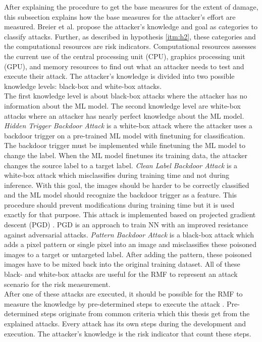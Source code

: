 After explaining the procedure to get the base measures for the extent of damage, this subsection explains how the base measures for the attacker's effort are measured. Breier et al. \cite{DBLP:journals/corr/abs-2012-04884} propose the attacker's knowledge and goal as categories to classify attacks. Further, as described in hypothesis \ref{itm:h2}, these categories and the computational resources are risk indicators. Computational resources assesses the current use of the central processing unit (CPU), graphics processing unit (GPU), and memory resources to find out what an attacker needs to test and execute their attack. The attacker's knowledge is divided into two possible knowledge levels: black-box and white-box attacks. \\
The first knowledge level is about black-box attacks where the attacker has no information about the ML model.
The second knowledge level are white-box attacks where an attacker has nearly perfect knowledge about the ML model.
\textit{Hidden Trigger Backdoor Attack} \cite{DBLP:journals/corr/abs-1910-00033} is a white-box attack where the attacker uses a backdoor trigger on a pre-trained ML model with finetuning for classification. The backdoor trigger must be implemented while finetuning the ML model to change the label. When the ML model finetunes its training data, the attacker changes the source label to a target label. \textit{Clean Label Backdoor Attack} \cite{turner2018clean} is a white-box attack which misclassifies during training time and not during inference. With this goal, the images should be harder to be correctly classified and the ML model should recognize the backdoor trigger as a feature. This procedure should prevent modifications during training time but it is used exactly for that purpose. This attack is implemented based on projected gradient descent (PGD) \cite{DBLP:journals/corr/MadryMSTV17}. PGD is an approach to train NN with an improved resistance against adversarial attacks.
\textit{Pattern Backdoor Attack} \cite{DBLP:journals/corr/abs-1708-06733} is a black-box attack which adds a pixel pattern or single pixel into an image and misclassifies these poisoned images to a target or untargeted label. After adding the pattern, these poisoned images have to be mixed back into the original training dataset. All of these black- and white-box attacks are useful for the RMF to represent an attack scenario for the risk measurement. \\
After one of these attacks are executed, it should be possible for the RMF to measure the knowledge by pre-determined steps to execute the attack \cite{bsi_2013}. Pre-determined steps originate from common criteria which this thesis get from the explained attacks. Every attack has its own steps during the development and execution. The attacker's knowledge is the risk indicator that count these steps. \\
